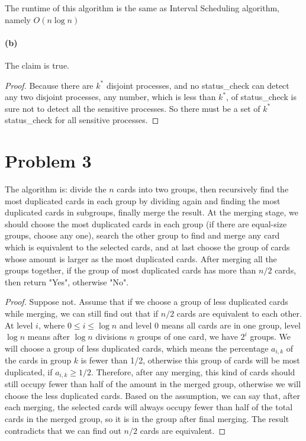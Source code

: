 \documentclass[letter,12pt]{article}
\begin{document}
The runtime of this algorithm is the same as Interval Scheduling 
algorithm, namely $O(n\log n)$

\paragraph*{(b)}
The claim is true.
\begin{proof}
Because there are $k^*$ disjoint processes, and no 
\textsf{status\_check} can detect any two disjoint processes, any
number, which is less than $k^*$, of \textsf{status\_check} is sure
not to detect all the sensitive processes. So there must be a set of
$k^*$ \textsf{status\_check} for all sensitive processes.
\end{proof}

\section*{Problem 3}
The algorithm is: divide the $n$ cards into two groups, then recursively 
find the most duplicated cards in each group by dividing again and 
finding the most duplicated cards in subgroups, finally merge the result.
At the merging stage, we should choose the most duplicated cards in 
each group (if there are equal-size groups, choose any one), search the 
other group to find and merge any card which is equivalent to the 
selected cards, and at last choose the group of cards 
whose amount is larger as the most duplicated cards. After merging
all the groups together, if the group of most duplicated cards has 
more than $n/2$ cards, then return "Yes", otherwise "No".

\begin{proof}
Suppose not. Assume that if we choose a group of less duplicated cards
while merging, we can still find out that if $n/2$ cards are equivalent 
to each other. At level $i$, where $0 \le i \le \log n$ and level 0 means
all cards are in one group, level $\log n$ means after $\log n$ divisions
$n$ groups of one card, we have $2^i$ groups. We will choose a 
group of less duplicated cards, which means the percentage $a_{i,k}$ of 
the cards in group $k$ is fewer than 1/2, otherwise this group of cards
will be most duplicated, if $a_{i,k} \geq 1/2$. Therefore, after any 
merging, this kind of cards should still occupy fewer than half of the 
amount in the merged group, otherwise we will choose the less 
duplicated cards. Based on the assumption, we can say that, after each
merging, the selected cards will always occupy fewer than half of the
total cards in the merged group, so it is in the group after final merging.
The result contradicts that we can find out $n/2$ cards are equivalent.
\end{proof}
\end{document}
